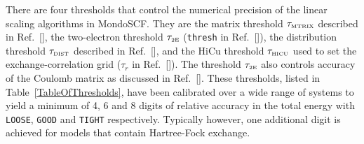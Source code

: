 \commentoutA{\documentclass[prb,aps,nobibnotes,twocolumn,doublespace,twocolumngrid,superbib,showpacs]{revtex4}}
\begin{document}
There are four thresholds that control the numerical precision of the linear scaling algorithms
in {\sc MondoSCF}.  They are the matrix threshold $\tau_{\rm \scriptscriptstyle MTRIX}$
described in Ref.~[], the two-electron threshold  $\tau_{\rm \scriptscriptstyle 2E}$ ({\tt thresh} in Ref.~[]),
the distribution threshold   $\tau_{\rm \scriptscriptstyle DIST}$ described in Ref.~[],
and the HiCu threshold $\tau_{\rm \scriptscriptstyle HICU}$ used to set the exchange-correlation grid ($\tau_r$ in 
Ref.~[]).  The threshold $\tau_{\rm \scriptscriptstyle 2E}$ also controls accuracy of the
Coulomb matrix as discussed in Ref.~[].
These thresholds, listed in Table~\ref{TableOfThresholds},  have been 
calibrated over a wide range of systems to yield a minimum of  4, 6 and 8 digits of relative accuracy in the total 
energy with {\tt LOOSE}, {\tt GOOD} and {\tt TIGHT} respectively.    Typically however, one additional digit is achieved for 
models that contain Hartree-Fock exchange.

 
\end{document}
